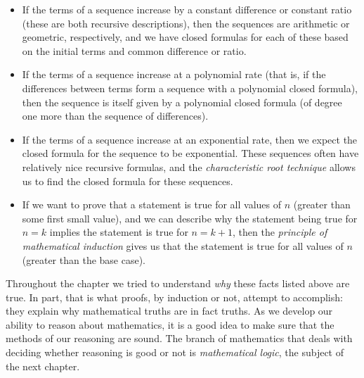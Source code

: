 \documentclass[12pt]{article}
\begin{document}
\begin{itemize}
\item If the terms of a sequence increase by a constant difference or constant ratio (these are both recursive descriptions), then the sequences are arithmetic or geometric, respectively, and we have closed formulas for each of these based on the initial terms and common difference or ratio.
\item If the terms of a sequence increase at a polynomial rate (that is, if the differences between terms form a sequence with a polynomial closed formula), then the sequence is itself given by a polynomial closed formula (of degree one more than the sequence of differences).
\item If the terms of a sequence increase at an exponential rate, then we expect the closed formula for the sequence to be exponential.  These sequences often have relatively nice recursive formulas, and the \emph{characteristic root technique} allows us to find the closed formula for these sequences.
\item If we want to prove that a statement is true for all values of $n$ (greater than some first small value), and we can describe why the statement being true for $n = k$ implies the statement is true for $n = k+1$, then the \emph{principle of mathematical induction} gives us that the statement is true for all values of $n$ (greater than the base case).
\end{itemize}

Throughout the chapter we tried to understand \emph{why} these facts listed above are true.  In part, that is what proofs, by induction or not, attempt to accomplish: they explain why mathematical truths are in fact truths.  As we develop our ability to reason about mathematics, it is a good idea to make sure that the methods of our reasoning are sound.  The branch of mathematics that deals with deciding whether reasoning is good or not is \emph{mathematical logic}, the subject of the next chapter.
\end{document}

